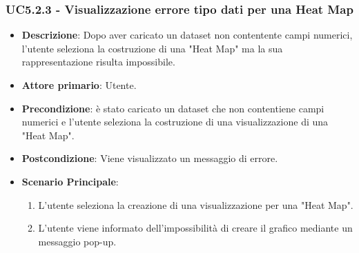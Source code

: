 \subsubsection{UC5.2.3 - Visualizzazione errore tipo dati per una Heat Map}
\label{subsec:uc5.1.2}
\begin{itemize}
    \item \textbf{Descrizione}: Dopo aver caricato un dataset non contentente campi numerici, 
                                l’utente seleziona la costruzione di una "Heat Map" ma 
                                la sua rappresentazione risulta impossibile.

    \item \textbf{Attore primario}: Utente.
    
    \item \textbf{Precondizione}:   è stato caricato un dataset che non contentiene campi numerici e l’utente 
                                    seleziona la costruzione di una visualizzazione di una "Heat Map".

    \item \textbf{Postcondizione}:  Viene visualizzato un messaggio di errore.
    
    \item \textbf{Scenario Principale}: 
    \begin{enumerate}
        \item L'utente seleziona la creazione di una visualizzazione per una "Heat Map".
        \item L'utente viene informato dell'impossibilità di creare il grafico mediante un messaggio pop-up.
    \end{enumerate}
\end{itemize}